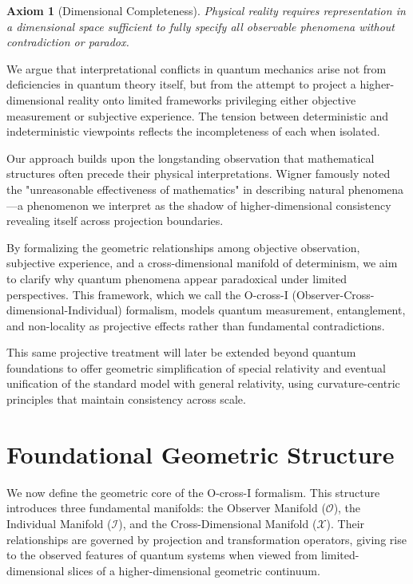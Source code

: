 \documentclass{article}
\newtheorem{axiom}{Axiom}
\begin{document}
\begin{axiom}[Dimensional Completeness]
Physical reality requires representation in a dimensional space sufficient to fully specify all observable phenomena without contradiction or paradox.
\end{axiom}

We argue that interpretational conflicts in quantum mechanics arise not from deficiencies in quantum theory itself, but from the attempt to project a higher-dimensional reality onto limited frameworks privileging either objective measurement or subjective experience. The tension between deterministic and indeterministic viewpoints reflects the incompleteness of each when isolated.

Our approach builds upon the longstanding observation that mathematical structures often precede their physical interpretations. Wigner famously noted the "unreasonable effectiveness of mathematics" in describing natural phenomena—a phenomenon we interpret as the shadow of higher-dimensional consistency revealing itself across projection boundaries.

By formalizing the geometric relationships among objective observation, subjective experience, and a cross-dimensional manifold of determinism, we aim to clarify why quantum phenomena appear paradoxical under limited perspectives. This framework, which we call the O-cross-I (Observer-Cross-dimensional-Individual) formalism, models quantum measurement, entanglement, and non-locality as projective effects rather than fundamental contradictions.

This same projective treatment will later be extended beyond quantum foundations to offer geometric simplification of special relativity and eventual unification of the standard model with general relativity, using curvature-centric principles that maintain consistency across scale.

\section{Foundational Geometric Structure}

We now define the geometric core of the O-cross-I formalism. This structure introduces three fundamental manifolds: the Observer Manifold ($\mathcal{O}$), the Individual Manifold ($\mathcal{I}$), and the Cross-Dimensional Manifold ($\mathcal{X}$). Their relationships are governed by projection and transformation operators, giving rise to the observed features of quantum systems when viewed from limited-dimensional slices of a higher-dimensional geometric continuum.
\end{document}
